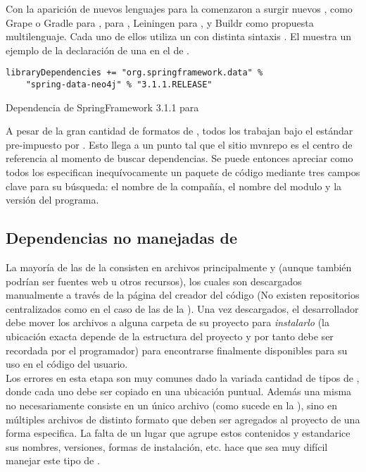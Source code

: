 Con la aparición de nuevos lenguajes para la \jvm comenzaron a surgir nuevos
\depmgrs, como Grape o Gradle para \groovy, \sbt para \scala, Leiningen para 
\clojure, y \apache Buildr como propuesta multilenguaje. Cada uno de ellos 
utiliza un \conffile con distinta sintaxis
. El 
 muestra un ejemplo de la declaración de 
una \dependency en el \conffile de \sbt.\\

\begin{listing}[htb]
\begin{verbatim}
libraryDependencies += "org.springframework.data" %
    "spring-data-neo4j" % "3.1.1.RELEASE"
\end{verbatim}
\caption{Dependencia de SpringFramework 3.1.1 para \sbt}
\label{code:depmgmnt:jvm:sbt_module_add}
\end{listing}

A pesar de la gran cantidad de formatos de \conffile, todos los \depmgrs
trabajan bajo el estándar pre-impuesto por \maven. Esto llega a un punto tal 
que el sitio \gls{mvnrepo} es el centro de referencia al momento de buscar 
dependencias. Se puede entonces apreciar como todos los \conffiles especifican
inequívocamente un paquete de código mediante tres campos clave para su 
búsqueda: el nombre de la compañía, el nombre del modulo y la versión del 
programa.\\

\subsection{Dependencias no manejadas de \viewtier}
\label{subsec:depmgmnt:jvm_dev:view_dependencies}

La mayoría de las \dependencies de la \viewtier consisten en archivos 
principalmente \css y \js (aunque también podrían ser fuentes web u otros 
recursos), los cuales son descargados manualmente a través de la página del 
creador del código (No existen repositorios centralizados como en el caso de 
las \dependencies de la \logictier). Una vez descargados, el desarrollador debe 
mover los archivos a alguna carpeta de su proyecto para \emph{instalarlo} (la 
ubicación exacta depende de la estructura del proyecto y por tanto debe ser 
recordada por el programador) para encontrarse finalmente disponibles para su 
uso en el código del usuario.\\
Los errores en esta etapa son muy comunes dado la variada cantidad de tipos de
\dependency, donde cada uno debe ser copiado en una ubicación puntual. Además 
una misma \dependency no necesariamente consiste en un único archivo (como 
sucede en la \logictier), sino en múltiples archivos de distinto formato que 
deben ser agregados al proyecto de una forma especifica. La falta de un lugar 
que agrupe estos contenidos y estandarice sus nombres, versiones, formas de 
instalación, etc. hace que sea muy difícil manejar este tipo de \dependencies.


